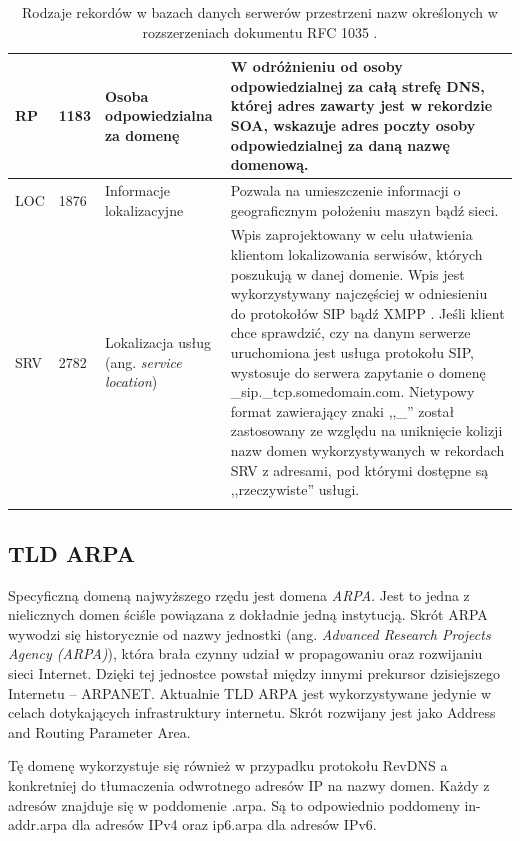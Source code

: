 \begin{longtable}{|l|p{0.7cm}|p{2.5cm}|p{7.5cm}|}
		RP & 1183 \cite{RFC1183} & Osoba odpowiedzialna za domenę & W odróżnieniu od osoby odpowiedzialnej za całą strefę DNS, której adres zawarty jest
		w rekordzie SOA, wskazuje adres poczty osoby odpowiedzialnej za daną nazwę domenową. \\ \hline

		LOC & 1876 \cite{RFC1876} & Informacje lokalizacyjne & Pozwala na umieszczenie informacji o geograficznym położeniu maszyn
		bądź sieci. \\ \hline

		SRV & 2782 \cite{RFC2782} & Lokalizacja usług (ang. \textit{service location}) &
		Wpis zaprojektowany w celu ułatwienia klientom lokalizowania serwisów, których poszukują w danej domenie.
		Wpis jest wykorzystywany najczęściej w odniesieniu do protokołów SIP \cite{RFC3261} bądź XMPP \cite{RFC3921}.
		Jeśli klient chce sprawdzić, czy na danym serwerze uruchomiona jest usługa protokołu SIP, wystosuje do serwera zapytanie o
		domenę \_sip.\_tcp.somedomain.com. Nietypowy format zawierający znaki ,,\_'' został zastosowany ze względu na uniknięcie kolizji
		nazw domen wykorzystywanych w rekordach SRV z adresami, pod którymi dostępne są ,,rzeczywiste'' usługi. \\

		\hline
\caption{Rodzaje rekordów w bazach danych serwerów przestrzeni nazw określonych w rozszerzeniach dokumentu RFC 1035 \cite{RFC1035}.}
\label{typyRekordowDnsExt}
\end{longtable}

\subsection{TLD ARPA}
\noindent Specyficzną domeną najwyższego rzędu jest domena \textit{ARPA}. Jest to jedna z nielicznych domen ściśle powiązana z dokładnie jedną
instytucją. Skrót ARPA wywodzi się historycznie od nazwy jednostki (ang. \textit{Advanced Research Projects Agency (ARPA)}), która
brała czynny udział w propagowaniu oraz rozwijaniu sieci Internet. Dzięki tej jednostce powstał między innymi prekursor dzisiejszego
Internetu -- ARPANET. Aktualnie TLD ARPA jest wykorzystywane jedynie w celach dotykających infrastruktury internetu. Skrót rozwijany jest
jako Address and Routing Parameter Area.

Tę domenę wykorzystuje się również w przypadku protokołu RevDNS a konkretniej do tłumaczenia
odwrotnego adresów IP na nazwy domen. Każdy z adresów znajduje się w poddomenie .arpa. Są to odpowiednio poddomeny in-addr.arpa dla
adresów IPv4 oraz ip6.arpa dla adresów IPv6.

